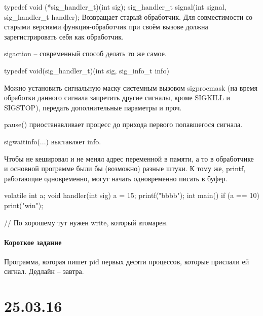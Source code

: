 \documentclass[a4paper,10pt]{article}
\begin{document}
typedef void (*sig\_handler\_t)(int sig);
sig\_handler\_t signal(int signal, sig\_handler\_t handler);
Возвращает старый обработчик.
Для совместимости со старыми версиями функция-обработчик при своём вызове должна зарегистрировать себя как обработчик.

sigaction -- современный способ делать то же самое.

typedef void(sig\_handler\_t)(int sig, sig\_info\_t info)

Можно установить сигнальную маску системным вызовом sigprocmask (на время обработки данного сигнала запретить другие сигналы, кроме SIGKILL и SIGSTOP), передать дополнительные параметры и проч.

pause() приостанавливает процесс до прихода первого попавшегося сигнала.

sigwaitinfo(...) выставляет info.

Чтобы не кешировал и не менял адрес переменной в памяти, а то в обработчике и основной программе были бы (возможно) разные штуки. К тому же, printf, работающие одновременно, могут начать одновременно писать в буфер.

volatile int a; 
void handler(int sig)
{
a = 15; printf("bbbb"); 
}
int main() {
if (a == 10) {
print("win");
}
}

// По хорошему тут нужен write, который атомарен.
\paragraph{Короткое задание}
Программа, которая пишет pid первых десяти процессов, которые прислали ей сигнал. Дедлайн -- завтра.

\section{25.03.16}
\paragraph{}
\end{document}
